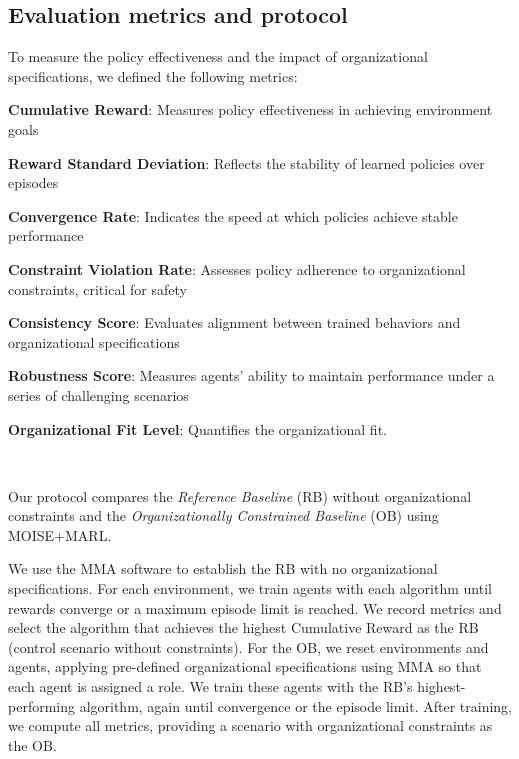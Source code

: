 \documentclass[sigconf]{aamas}
\begin{document}
\subsection{Evaluation metrics and protocol}

To measure the policy effectiveness and the impact of organizational specifications, we defined the following metrics:
%
\begin{enumerate*}[label={\roman*)}, itemjoin={; \quad}]
    \item \textbf{Cumulative Reward}: Measures policy effectiveness in achieving environment goals
    \item \textbf{Reward Standard Deviation}: Reflects the stability of learned policies over episodes
    \item \textbf{Convergence Rate}: Indicates the speed at which policies achieve stable performance
    \item \textbf{Constraint Violation Rate}: Assesses policy adherence to organizational constraints, critical for safety
    \item \textbf{Consistency Score}: Evaluates alignment between trained behaviors and organizational specifications
    \item \textbf{Robustness Score}: Measures agents' ability to maintain performance under a series of challenging scenarios
    \item \textbf{Organizational Fit Level}: Quantifies the organizational fit.
\end{enumerate*}

\

\noindent Our protocol compares the \textit{Reference Baseline} (RB) without organizational constraints and the \textit{Organizationally Constrained Baseline} (OB) using MOISE+MARL.

We use the MMA software to establish the RB with no organizational specifications. For each environment, we train agents with each algorithm until rewards converge or a maximum episode limit is reached. We record metrics and select the algorithm that achieves the highest Cumulative Reward as the RB (control scenario without constraints).
%
For the OB, we reset environments and agents, applying pre-defined organizational specifications using MMA so that each agent is assigned a role. We train these agents with the RB's highest-performing algorithm, again until convergence or the episode limit. After training, we compute all metrics, providing a scenario with organizational constraints as the OB.
\end{document}
